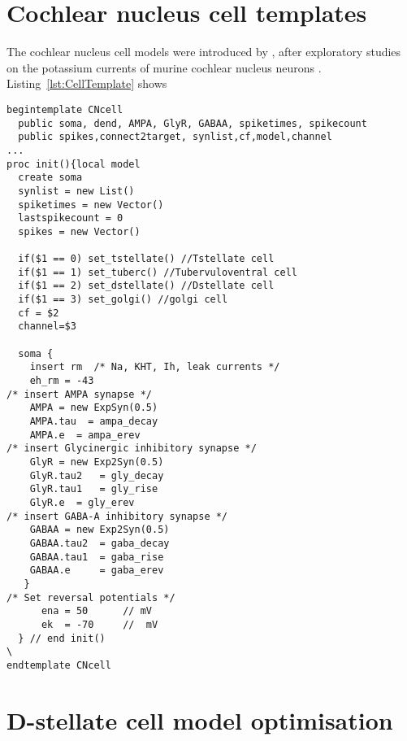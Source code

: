 \section{Cochlear nucleus cell templates}

The cochlear nucleus cell models were introduced by \citet{RothmanManis:2003b},
after exploratory studies on the potassium currents of murine cochlear nucleus
neurons
\citep{RothmanManis:2003,RothmanManis:2003a}. Listing~\ref{lst:CellTemplate}
shows

\begin{lstlisting}[label=lst:CellTemplate,caption=Rothman and Manis cochlear
  nucleus cell template (in CNcell.tem)]
begintemplate CNcell
  public soma, dend, AMPA, GlyR, GABAA, spiketimes, spikecount
  public spikes,connect2target, synlist,cf,model,channel
...
proc init(){local model
  create soma
  synlist = new List()
  spiketimes = new Vector()
  lastspikecount = 0
  spikes = new Vector()
    
  if($1 == 0) set_tstellate() //Tstellate cell
  if($1 == 1) set_tuberc() //Tubervuloventral cell
  if($1 == 2) set_dstellate() //Dstellate cell
  if($1 == 3) set_golgi() //golgi cell
  cf = $2
  channel=$3

  soma {
    insert rm  /* Na, KHT, Ih, leak currents */
    eh_rm = -43 
/* insert AMPA synapse */
    AMPA = new ExpSyn(0.5)
    AMPA.tau  = ampa_decay
    AMPA.e 	= ampa_erev
/* insert Glycinergic inhibitory synapse */
    GlyR = new Exp2Syn(0.5)
    GlyR.tau2	= gly_decay
    GlyR.tau1	= gly_rise
    GlyR.e 	= gly_erev
/* insert GABA-A inhibitory synapse */
    GABAA = new Exp2Syn(0.5)
    GABAA.tau2 	= gaba_decay
    GABAA.tau1 	= gaba_rise
    GABAA.e 	= gaba_erev
   }
/* Set reversal potentials */
      ena = 50		// mV
      ek  = -70		//  mV
  }	// end init()
\
endtemplate CNcell 

\end{lstlisting}

\section{D-stellate cell model optimisation}







